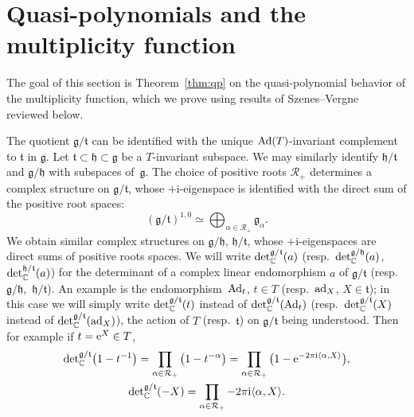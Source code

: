 \documentclass[11pt]{article}
\numberwithin{equation}{section}
\newcommand{\pair}[2]{\langle #1, #2 \rangle}
\newcommand{\tn}[1]{\textnormal{#1}}
\renewcommand{\i}{{\mathrm{i}}}
\def\Ad{\ensuremath{\textnormal{Ad}}}
\def\ad{\ensuremath{\textnormal{ad}}}
\def\g{\ensuremath{\mathfrak{g}}}
\def\t{\ensuremath{\mathfrak{t}}}
\def\h{\ensuremath{\mathfrak{h}}}
\def\R{\ensuremath{\mathcal{R}}}
\def\bC{\ensuremath{\mathbb{C}}}
\def\de{\ensuremath{\tn{det}_\bC}}
\begin{document}
\setcounter{section}{1}
\setcounter{subsection}{0}
\setcounter{subsubsection}{0}
\setcounter{Theorem}{2}
\setcounter{equation}{3}
\section{Quasi-polynomials and the multiplicity function}\label{sec:mult}
The goal of this section is Theorem~\ref{thm:qp} on the quasi-polynomial behavior of the multiplicity function, which we prove using results of Szenes--Vergne~\cite{SzenesVergne2010} reviewed below.

The quotient $\g/\t$ can be identified with the unique $\Ad(T)$-invariant complement to $\t$ in $\g$. Let $\t \subset \h \subset \g$ be a $T$-invariant subspace. We may similarly identify $\h/\t$ and $\g/\h$ with subspaces of~$\g$. The choice of positive roots $\R_+$ determines a complex structure on $\g/\t$, whose $+\i$-eigenspace is identified with the direct sum of the positive root spaces:
\[ (\g/\t)^{1,0}\simeq \bigoplus_{\alpha \in \R_+} \g_\alpha.\]
We obtain similar complex structures on $\g/\h$, $\h/\t$, whose $+\i$-eigenspaces are direct sums of positive roots spaces. We will write $\de^{\g/\t}(a)$ (resp.~$\de^{\g/\h}(a)$, $\de^{\h/\t}(a)$) for the determinant of a complex linear endomorphism $a$ of $\g/\t$ (resp.~$\g/\h$,~$\h/\t$). An example is the endomorphism~$\Ad_t$, $t \in T$ (resp.~$\ad_X$, $X \in \t$); in this case we will simply write $\de^{\g/\t}(t)$ instead of $\de^{\g/\t}(\Ad_t)$ (resp.~$\de^{\g/\t}(X)$ instead of $\de^{\g/\t}(\ad_X)$), the action of $T$ (resp.~$\t$) on $\g/\t$ being understood. Then for example if $t={\rm e}^X \in T$,
\begin{gather*} \de^{\g/\t}\big(1-t^{-1}\big)=\prod_{\alpha \in \R_+}\big(1-t^{-\alpha}\big)=\prod_{\alpha \in \R_+}\big(1-{\rm e}^{-2\pi \i \pair{\alpha}{X}}\big), \\
 \de^{\g/\t}(-X)=\prod_{\alpha \in \R_+} -2\pi \i \pair{\alpha}{X}.\end{gather*}
\end{document}
